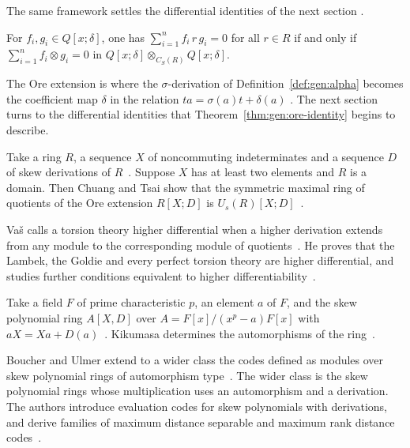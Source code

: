 The same framework settles the differential identities of the next section
\cite[p.~172]{ChuangLee2010Higher}.

\begin{theorem}\label{thm:gen:ore-identity}
For $f_i,g_i\in Q[x;\delta]$, one has $\sum_{i=1}^n f_i\, r\, g_i=0$ for all
$r\in R$ if and only if $\sum_{i=1}^n f_i\otimes g_i=0$ in
$Q[x;\delta]\otimes_{C_S(R)}Q[x;\delta]$.
\end{theorem}

The Ore extension is where the $\sigma$-derivation of
Definition~\ref{def:gen:alpha} becomes the coefficient map $\delta$ in the
relation $ta=\sigma(a)t+\delta(a)$ \cite[p.~2838]{Chuang2017Auto}. The next
section turns to the
differential identities that Theorem~\ref{thm:gen:ore-identity} begins to
describe.

Take a ring $R$, a sequence $X$ of noncommuting indeterminates and a sequence
$D$ of skew derivations of $R$~\cite{WlSymmetricUtumiQuotientRingsOfO2010}. Suppose $X$ has at
least two elements and $R$ is a domain. Then Chuang and Tsai show that the
symmetric maximal ring of
quotients of the Ore extension $R[X;D]$ is
$U_s(R)[X;D]$~\cite{WlSymmetricUtumiQuotientRingsOfO2010}.

Va\v{s} calls a torsion theory higher differential when a higher derivation
extends from any module to the corresponding module of quotients~\cite{WlExtendingHigherDerivationsToRi2008}. He proves that
the Lambek, the Goldie and every perfect torsion theory are higher
differential, and studies further conditions equivalent to higher
differentiability~\cite{WlExtendingHigherDerivationsToRi2008}.

Take a field $F$ of prime characteristic $p$, an element $a$ of $F$, and the
skew polynomial ring $A[X,D]$ over $A=F[x]/(x^p-a)F[x]$ with $aX=Xa+D(a)$~\cite{WlAutomorphismsOfACertainSkewPol1990}.
Kikumasa determines the automorphisms of the
ring~\cite{WlAutomorphismsOfACertainSkewPol1990}.

Boucher and Ulmer extend to a wider class the codes defined as modules over
skew polynomial
rings of automorphism type~\cite{WlLinearCodesUsingSkewPolynomial2014}. The wider class is the skew polynomial
rings whose multiplication uses
an automorphism and a derivation. The authors introduce evaluation codes for
skew
polynomials with derivations, and derive families of maximum distance
separable and maximum rank distance
codes~\cite{WlLinearCodesUsingSkewPolynomial2014}.

